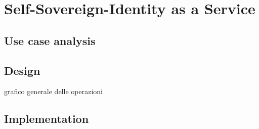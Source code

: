 
\section{Self-Sovereign-Identity as a Service}
\subsection{Use case analysis}

\subsection{Design}
grafico generale delle operazioni
\subsection{Implementation}
